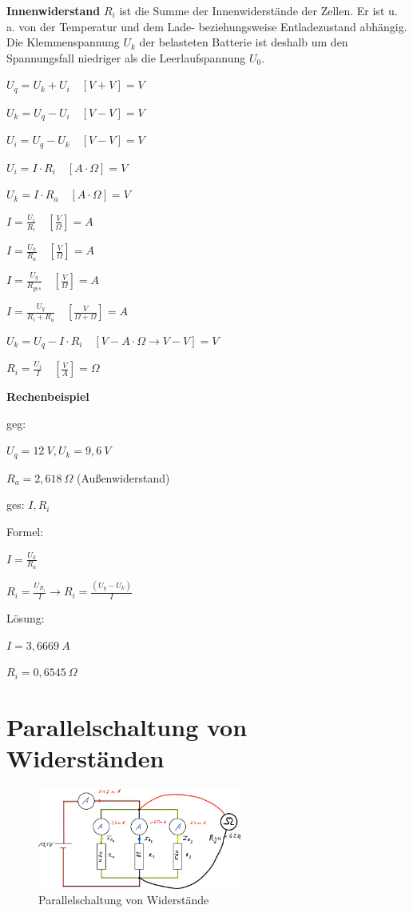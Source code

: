 \textbf{Innenwiderstand} $R_i$ ist die Summe der Innenwiderstände der
Zellen. Er ist u. a. von der Temperatur und dem Lade- beziehungsweise
Entladezustand abhängig. Die Klemmenspannung $U_k$ der belasteten
Batterie ist deshalb um den Spannungsfall niedriger als die
Leerlaufspannung $U_0$.

$U_q = U_k + U_i \quad [V + V] = V$

$U_k = U_q - U_i \quad [V - V] = V$

$U_i = U_q - U_k \quad [V - V] = V$

$U_i = I \cdot R_i \quad [A \cdot \Omega] = V$

$U_k = I \cdot R_a \quad [A \cdot \Omega] = V$

$I = \frac{U_i}{R_i} \quad [\frac{V}{\Omega}] = A$

$I = \frac{U_k}{R_a} \quad [\frac{V}{\Omega}] = A$

$I = \frac{U_q}{R_{ges}} \quad [\frac{V}{\Omega}] = A$

$I = \frac{U_q}{R_i + R_a} \quad [\frac{V}{\Omega + \Omega}] = A$

$\boxed{U_k = U_q - I \cdot R_i} \quad [V - A \cdot \Omega \rightarrow V - V] = V$

$\boxed{R_i = \frac{U_i}{I}} \quad [\frac{V}{A}] = \Omega$

\textbf{Rechenbeispiel}

geg:

$U_q = 12~V, U_k = 9,6~V$

$R_a = 2,618~\Omega$ (Außenwiderstand)

ges: $I, R_i$

Formel:

$I = \frac{U_k}{R_a}$

$R_i = \frac{U_{R_i}}{I} \to R_i = \frac{(U_q - U_k)}{I}$

Lösung:

$I = 3,6669~A$

$R_i = 0,6545~\Omega$

\newpage

\section{Parallelschaltung von
Widerständen}\label{parallelschaltung-von-widerstaenden}

\begin{figure}[!ht]%
\centering
\includegraphics[width=0.6\textwidth]{images/Skizze/19_Parallelschaltung_Widerstaende_Skizze.pdf}
\caption{Parallelschaltung von Widerstände}
\end{figure}

